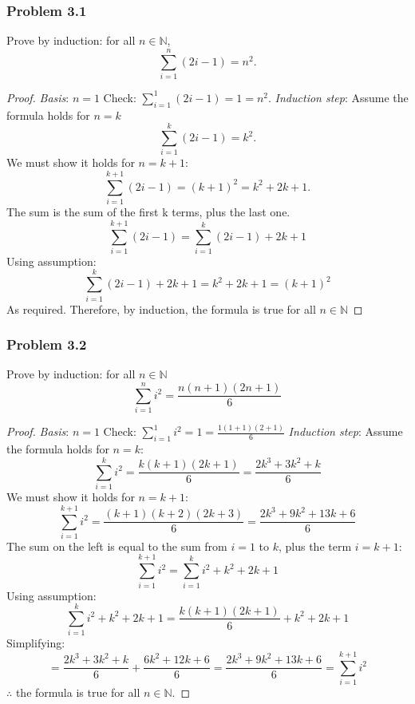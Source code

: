 \documentclass[hidelinks,12pt]{article}
\newcommand{\N}{\mathbb{N}}
\begin{document}
\subsubsection{Problem 3.1}
Prove by induction: for all $n \in \N$,
\begin{displaymath}
\sum_{i=1}^{n}(2i-1) = n^2.
\end{displaymath}
\begin{proof} \emph{Basis}: $n=1$ Check: $\sum_{i=1}^{1}(2i-1)=1=n^2$.
\newline\emph{Induction step}: Assume the formula holds for $n=k$
\begin{displaymath}
\sum_{i=1}^{k}(2i-1) = k^2.
\end{displaymath}
We must show it holds for $n=k+1$:
\begin{displaymath}
\sum_{i=1}^{k+1}(2i-1) = (k+1)^2=k^2+2k+1.
\end{displaymath}
The sum is the sum of the first k terms, plus the last one.
\begin{displaymath}
\sum_{i=1}^{k+1}(2i-1)=\sum_{i=1}^{k}(2i-1)+2k+1
\end{displaymath}
Using assumption:
\begin{displaymath}
\sum_{i=1}^{k}(2i-1)+2k+1=k^2+2k+1 = (k+1)^2
\end{displaymath}
As required. Therefore, by induction, the formula is true for all $n \in \N$ \end{proof}
\subsubsection{Problem 3.2}
Prove by induction: for all $n \in \N$
\begin{displaymath}
\sum_{i=1}^{n}i^2=\frac{n(n+1)(2n+1)}{6}
\end{displaymath}
\begin{proof} \emph{Basis}: $n=1$ Check: $\sum_{i=1}^{1}i^2=1=\frac{1(1+1)(2+1)}{6}$
\newline \emph{Induction step}: Assume the formula holds for $n=k$:
\begin{displaymath}
\sum_{i=1}^{k}i^2=\frac{k(k+1)(2k+1)}{6}=\frac{2k^3+3k^2+k}{6}
\end{displaymath}
We must show it holds for $n=k+1$:
\begin{displaymath}
\sum_{i=1}^{k+1}i^2=\frac{(k+1)(k+2)(2k+3)}{6}=\frac{2k^3+9k^2+13k+6}{6}
\end{displaymath}
The sum on the left is equal to the sum from $i=1$ to $k$, plus the term $i=k+1$:
\begin{displaymath}
\sum_{i=1}^{k+1}i^2=\sum_{i=1}^{k}i^2+k^2+2k+1
\end{displaymath}
Using assumption:
\begin{displaymath}
\sum_{i=1}^{k}i^2+k^2+2k+1=\frac{k(k+1)(2k+1)}{6}+k^2+2k+1
\end{displaymath}
Simplifying:
\begin{displaymath}
= \frac{2k^3+3k^2+k}{6}+\frac{6k^2+12k+6}{6}=\frac{2k^3+9k^2+13k+6}{6}=\sum_{i=1}^{k+1}i^2
\end{displaymath}
$\therefore$ the formula is true for all $n \in \N$. \end{proof}
\end{document}
